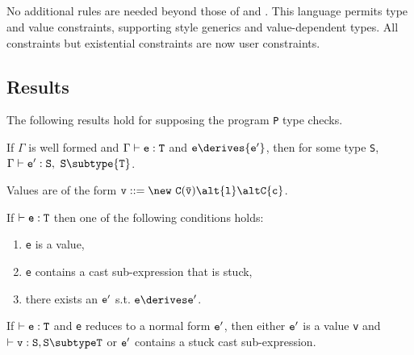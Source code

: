 \subsection{\FXGD} 

No additional rules are needed beyond those of \FXG{} and \FXD{}. This
language permits type and value constraints, supporting \FGJ{} style
generics and value-dependent types. All constraints but existential constraints are now user constraints.

\subsection{Results}
The following results hold for \FXGD supposing the program {\tt P} type checks.

\begin{theorem} If $\Gamma$ is well formed and $\Gamma \vdash {\tt e:T}$ and ${\tt e} \derives {\tt e'}$, then
for some type {\tt S}, $\Gamma \vdash {\tt {\tt e}':{\tt S}},~{\tt S} \subtype {\tt T}$.
\end{theorem}

Values are of the form $\tt v ::= \new\ C(\bar{\tt v}) \alt {\tt l} \alt C\{c\}$.

\begin{theorem}[Progress]
If $\vdash {\tt e:T}$ then one of the following conditions holds:
\begin{enumerate}
\item {\tt e} is a value,
\item {\tt e} contains a cast sub-expression that is stuck,
\item there exists an $\tt e'$ s.t. $\tt e\derives e'$.
\end{enumerate}
\end{theorem}

\begin{theorem}
If $\vdash {\tt e:T}$ and {\tt e}
reduces to a normal form ${\tt e'}$, then
either $\tt e'$ is a value {\tt v} and $\vdash {\tt v:S},{\tt S\subtype T}$ or
${\tt e'}$ contains  a stuck cast sub-expression.
\end{theorem}

